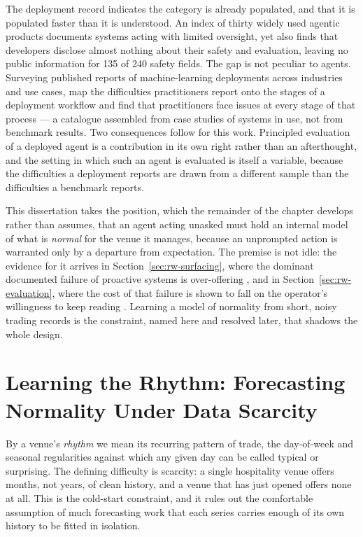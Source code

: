The deployment record indicates the category is already populated, and that it
is populated faster than it is understood. An index of thirty widely used
agentic products \citep[a 2026 preprint]{staufer_2025_2026} documents systems
acting with limited oversight, yet also finds that developers disclose almost
nothing about their safety and evaluation, leaving no public information for
135 of 240 safety fields. The gap is not peculiar to agents. Surveying
published reports of machine-learning deployments across industries and use
cases, \citet{paleyes_challenges_2022} map the difficulties practitioners
report onto the stages of a deployment workflow and find that practitioners
face issues at every stage of that process --- a catalogue assembled from case
studies of systems in use, not from benchmark results. Two consequences follow
for this work. Principled evaluation of a deployed agent is a contribution in
its own right rather than an afterthought, and the setting in which such an
agent is evaluated is itself a variable, because the difficulties a deployment
reports are drawn from a different sample than the difficulties a benchmark
reports.

This dissertation takes the position, which the remainder of the chapter
develops rather than assumes, that an agent acting unasked must hold an
internal model of what is \emph{normal} for the venue it manages, because an
unprompted action is warranted only by a departure from expectation. The
premise is not idle: the evidence for it arrives in
Section~\ref{sec:rw-surfacing}, where the dominant documented failure of
proactive systems is over-offering \citep{lu_proactive_2024}, and in
Section~\ref{sec:rw-evaluation}, where the cost of that failure is shown to
fall on the operator's willingness to keep reading
\citep{dixon_independence_2007,ancker_effects_2017}. Learning a model of
normality from short, noisy trading records is the constraint, named here and
resolved later, that shadows the whole design.

\section{Learning the Rhythm: Forecasting Normality Under Data Scarcity}
\label{sec:rw-rhythm}

By a venue's \emph{rhythm} we mean its recurring pattern of trade, the
day-of-week and seasonal regularities against which any given day can be
called typical or surprising. The defining difficulty is scarcity: a single
hospitality venue offers months, not years, of clean history, and a venue
that has just opened offers none at all. This is the cold-start constraint,
and it rules out the comfortable assumption of much forecasting work that each
series carries enough of its own history to be fitted in isolation.

